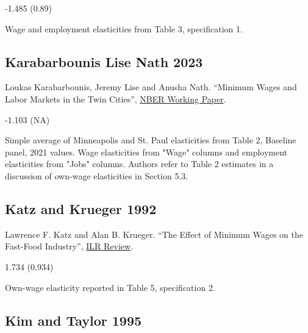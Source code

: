  -1.485 (0.89)

\vspace{0.7em}

 Wage and employment elasticities from Table 3, specification 1.

\subsection*{Karabarbounis Lise Nath 2023}
\vspace{-0.7em}

\noindent Loukas Karabarbounis, Jeremy Lise and Anusha Nath. ``Minimum Wages and Labor Markets in the Twin Cities'', \href{https://www.nber.org/system/files/working_papers/w30239/w30239.pdf}{NBER Working Paper}.

\vspace{0.7em}

 -1.103 (NA)

\vspace{0.7em}

 Simple average of Minneapolis and St. Paul elasticities from Table 2, Baseline panel, 2021 values. Wage elasticities from "Wage" columns and employment elasticities from "Jobs" columns. Authors refer to Table 2 estimates in a discussion of own-wage elasticities in Section 5.3.

\subsection*{Katz and Krueger 1992}
\vspace{-0.7em}

\noindent Lawrence F. Katz and Alan B. Krueger. ``The Effect of Minimum Wages on the Fast-Food Industry'', \href{https://doi.org/10.1177/001979399204600102}{ILR Review}.

\vspace{0.7em}

 1.734 (0.934)

\vspace{0.7em}

 Own-wage elasticity reported in Table 5, specification 2.

\subsection*{Kim and Taylor 1995}
\vspace{-0.7em}

